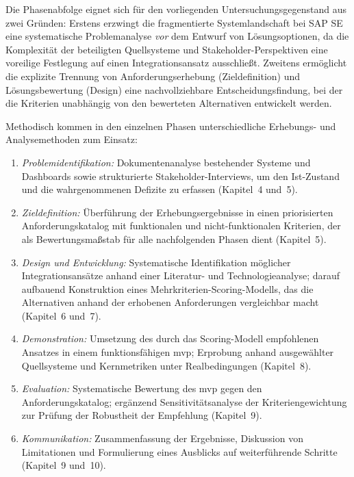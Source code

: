 Die Phasenabfolge eignet sich für den vorliegenden Untersuchungsgegenstand aus zwei Gründen: Erstens erzwingt die fragmentierte Systemlandschaft bei SAP SE eine systematische Problemanalyse \textit{vor} dem Entwurf von Lösungsoptionen, da die Komplexität der beteiligten Quellsysteme und Stakeholder-Perspektiven eine voreilige Festlegung auf einen Integrationsansatz ausschließt.
Zweitens ermöglicht die explizite Trennung von Anforderungserhebung (Zieldefinition) und Lösungsbewertung (Design) eine nachvollziehbare Entscheidungsfindung, bei der die Kriterien unabhängig von den bewerteten Alternativen entwickelt werden.

Methodisch kommen in den einzelnen Phasen unterschiedliche Erhebungs- und Analysemethoden zum Einsatz:

\begin{enumerate}
    \item \textit{Problemidentifikation:} Dokumentenanalyse bestehender Systeme und Dashboards sowie strukturierte Stakeholder-Interviews, um den Ist-Zustand und die wahrgenommenen Defizite zu erfassen (Kapitel~4 und~5).
    \item \textit{Zieldefinition:} Überführung der Erhebungsergebnisse in einen priorisierten Anforderungskatalog mit funktionalen und nicht-funktionalen Kriterien, der als Bewertungsmaßstab für alle nachfolgenden Phasen dient (Kapitel~5).
    \item \textit{Design und Entwicklung:} Systematische Identifikation möglicher Integrationsansätze anhand einer Literatur- und Technologieanalyse; darauf aufbauend Konstruktion eines Mehrkriterien-Scoring-Modells, das die Alternativen anhand der erhobenen Anforderungen vergleichbar macht (Kapitel~6 und~7).
    \item \textit{Demonstration:} Umsetzung des durch das Scoring-Modell empfohlenen Ansatzes in einem funktionsfähigen \gls{mvp}; Erprobung anhand ausgewählter Quellsysteme und Kernmetriken unter Realbedingungen (Kapitel~8).
    \item \textit{Evaluation:} Systematische Bewertung des \gls{mvp} gegen den Anforderungskatalog; ergänzend Sensitivitätsanalyse der Kriteriengewichtung zur Prüfung der Robustheit der Empfehlung (Kapitel~9).
    \item \textit{Kommunikation:} Zusammenfassung der Ergebnisse, Diskussion von Limitationen und Formulierung eines Ausblicks auf weiterführende Schritte (Kapitel~9 und~10).
\end{enumerate}
